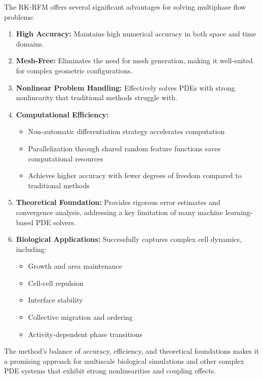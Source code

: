 \documentclass[11pt]{article}
\begin{document}
The RK-RFM offers several significant advantages for solving multiphase flow problems:

\begin{enumerate}
    \item \textbf{High Accuracy:} Maintains high numerical accuracy in both space and time domains.
    
    \item \textbf{Mesh-Free:} Eliminates the need for mesh generation, making it well-suited for complex geometric configurations.
    
    \item \textbf{Nonlinear Problem Handling:} Effectively solves PDEs with strong nonlinearity that traditional methods struggle with.
    
    \item \textbf{Computational Efficiency:} 
    \begin{itemize}
        \item Non-automatic differentiation strategy accelerates computation
        \item Parallelization through shared random feature functions saves computational resources
        \item Achieves higher accuracy with fewer degrees of freedom compared to traditional methods
    \end{itemize}
    
    \item \textbf{Theoretical Foundation:} Provides rigorous error estimates and convergence analysis, addressing a key limitation of many machine learning-based PDE solvers.
    
    \item \textbf{Biological Applications:} Successfully captures complex cell dynamics, including:
    \begin{itemize}
        \item Growth and area maintenance
        \item Cell-cell repulsion
        \item Interface stability
        \item Collective migration and ordering
        \item Activity-dependent phase transitions
    \end{itemize}
\end{enumerate}

The method's balance of accuracy, efficiency, and theoretical foundations makes it a promising approach for multiscale biological simulations and other complex PDE systems that exhibit strong nonlinearities and coupling effects.
\end{document}
